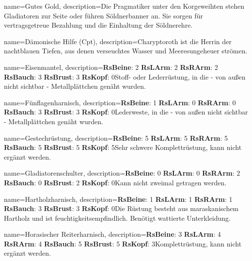 {
    name={Gutes Gold},
    description={Die Pragmatiker unter den Korgeweihten stehen Gladiatoren zur Seite oder führen Söldnerbanner an. Sie sorgen für vertragsgetreue Bezahlung und die Einhaltung der Söldnerehre.}
}


{
    name={Dämonische Hilfe (Cpt)},
    description={Charyptoroth ist die Herrin der nachtblauen Tiefen, aus denen verseuchtes Wasser und Meeresungeheuer strömen.}
}


{
    name={Eisenmantel},
    description={\textbf{RsBeine}: 2 \textbf{RsLArm}: 2 \textbf{RsRArm}: 2 \textbf{RsBauch}: 3 \textbf{RsBrust}: 3 \textbf{RsKopf}: 0\newline Stoff- oder Lederrüstung, in die - von außen nicht sichtbar - Metallplättchen genäht wurden.}
}


{
    name={Fünflagenharnisch},
    description={\textbf{RsBeine}: 1 \textbf{RsLArm}: 0 \textbf{RsRArm}: 0 \textbf{RsBauch}: 3 \textbf{RsBrust}: 3 \textbf{RsKopf}: 0\newline Lederweste, in die - von außen nicht sichtbar - Metallplättchen genäht wurden.}
}


{
    name={Gestechrüstung},
    description={\textbf{RsBeine}: 5 \textbf{RsLArm}: 5 \textbf{RsRArm}: 5 \textbf{RsBauch}: 5 \textbf{RsBrust}: 5 \textbf{RsKopf}: 5\newline Sehr schwere Komplettrüstung, kann nicht ergänzt werden.}
}


{
    name={Gladiatorenschulter},
    description={\textbf{RsBeine}: 0 \textbf{RsLArm}: 0 \textbf{RsRArm}: 2 \textbf{RsBauch}: 0 \textbf{RsBrust}: 2 \textbf{RsKopf}: 0\newline Kann nicht zweimal getragen werden.}
}


{
    name={Hartholzharnisch},
    description={\textbf{RsBeine}: 1 \textbf{RsLArm}: 1 \textbf{RsRArm}: 1 \textbf{RsBauch}: 3 \textbf{RsBrust}: 3 \textbf{RsKopf}: 0\newline Die Rüstung besteht aus maraskanischem Hartholz und ist feuchtigkeitsempfindlich. Benötigt wattierte Unterkleidung.}
}


{
    name={Horasischer Reiterharnisch},
    description={\textbf{RsBeine}: 3 \textbf{RsLArm}: 4 \textbf{RsRArm}: 4 \textbf{RsBauch}: 5 \textbf{RsBrust}: 5 \textbf{RsKopf}: 3\newline Komplettrüstung, kann nicht ergänzt werden.}
}


